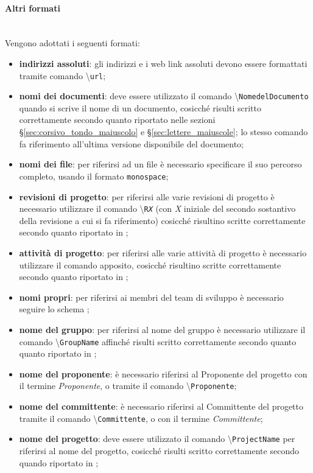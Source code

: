\paragraph{Altri formati} \mbox{} \\
Vengono adottati i seguenti formati:
\begin{itemize}
	\item \textbf{indirizzi assoluti}: gli indirizzi \email{} e i web link assoluti devono essere formattati tramite comando \glossario{\LaTeX{}} \textbackslash{\texttt{url}};
	\item \textbf{nomi dei documenti}: deve essere utilizzato il comando \glossario{\LaTeX{}} \textbackslash{\texttt{NomedelDocumento}} quando si scrive il nome di un documento, cosicché risulti scritto correttamente secondo quanto riportato nelle sezioni §\ref{sec:corsivo_tondo_maiuscolo} e §\ref{sec:lettere_maiuscole}; lo stesso comando fa riferimento all'ultima versione disponibile del documento;
	\item \textbf{nomi dei file}: per riferirsi ad un file è necessario specificare il suo percorso completo, usando il formato \texttt{monospace};
	\item \textbf{revisioni di progetto}: per riferirsi alle varie revisioni di progetto è necessario utilizzare il comando \glossario{\LaTeX{}} \textbackslash{\texttt{R\textit{X}}} (con \textit{X} iniziale del secondo sostantivo della revisione a cui si fa riferimento) cosicché risultino scritte correttamente secondo quanto riportato in ;
	\item \textbf{attività di progetto}: per riferirsi alle varie attività di progetto è necessario utilizzare il comando \glossario{\LaTeX{}} apposito, cosicché risultino scritte correttamente secondo quanto riportato in ;
	\item \textbf{nomi propri}: per riferirsi ai membri del team di sviluppo è necessario seguire lo schema ;
	\item \textbf{nome del gruppo}: per riferirsi al nome del gruppo è necessario utilizzare il comando \glossario{\LaTeX{}} \textbackslash{\texttt{GroupName}} affinché risulti scritto correttamente secondo quanto quanto riportato in ;
	\item \textbf{nome del proponente}: è necessario riferirsi al Proponente del progetto con il termine \textit{Proponente}, o tramite il comando \glossario{\LaTeX{}} \textbackslash{\texttt{Proponente}};
	\item \textbf{nome del committente}: è necessario riferirsi al Committente del progetto tramite il comando \glossario{\LaTeX{}} \textbackslash{\texttt{Committente}}, o con il termine \textit{Committente};
	\item \textbf{nome del progetto}: deve essere utilizzato il comando \glossario{\LaTeX{}} \textbackslash{\texttt{ProjectName}} per riferirsi al nome del progetto, cosicché risulti scritto correttamente secondo quando riportato in ;
\end{itemize}

